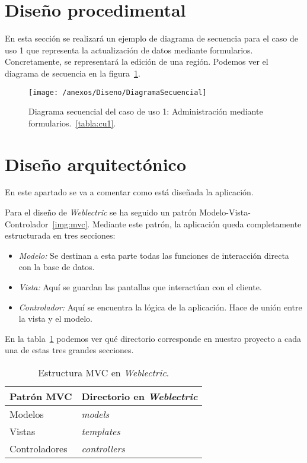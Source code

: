 \newpage

\section{Diseño procedimental}

En esta sección se realizará un ejemplo de diagrama de secuencia para el caso de uso 1 que representa la actualización de datos mediante formularios. Concretamente, se representará la edición de una región. Podemos ver el diagrama de secuencia en la figura~\ref{img:modeloSecuencial}.

\begin{figure}[h]
	\centering
	\texttt{[image: /anexos/Diseno/DiagramaSecuencial]}
	\caption{Diagrama secuencial del caso de uso 1: Administración mediante formularios.~\ref{tabla:cu1}.}
	\label{img:modeloSecuencial}
\end{figure}

\newpage

\section{Diseño arquitectónico}

En este apartado se va a comentar como está diseñada la aplicación.

Para el diseño de \textit{Weblectric} se ha seguido un patrón Modelo-Vista-Controlador~\ref{img:mvc}. Mediante este patrón, la aplicación queda completamente estructurada en tres secciones:

\begin{itemize}
	
	\item \textit{Modelo:} Se destinan a esta parte todas las funciones de interacción directa con la base de datos.
	
	\item \textit{Vista:} Aquí se guardan las pantallas que interactúan con el cliente.
	
	\item \textit{Controlador:} Aquí se encuentra la lógica de la aplicación. Hace de unión entre la vista y el modelo.

\end{itemize}

En la tabla~\ref{tabla:estructuraMVC} podemos ver qué directorio corresponde en nuestro proyecto a cada una de estas tres grandes secciones.

\begin{table}[h]
	\centering
	\caption{Estructura MVC en \textit{Weblectric}.}
	\label{tabla:estructuraMVC}
	\begin{tabular}{p{5cm} p{5cm}}
		\toprule
		Patrón MVC 					 & Directorio en \textit{Weblectric}  \\ \midrule
		Modelos			        	 & \textit{models} 			    \\ 
		Vistas						 & \textit{templates}		    \\
		Controladores          		 & \textit{controllers}		 	\\ \bottomrule
	\end{tabular}
\end{table}


